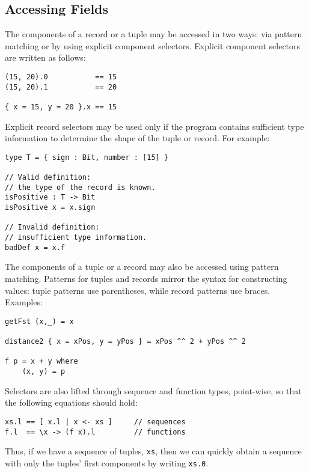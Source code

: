 \hypertarget{accessing-fields}{%
\subsection{Accessing Fields}\label{accessing-fields}}

The components of a record or a tuple may be accessed in two ways: via
pattern matching or by using explicit component selectors. Explicit
component selectors are written as follows:

\begin{verbatim}
(15, 20).0           == 15
(15, 20).1           == 20

{ x = 15, y = 20 }.x == 15
\end{verbatim}

Explicit record selectors may be used only if the program contains
sufficient type information to determine the shape of the tuple or
record. For example:

\begin{verbatim}
type T = { sign : Bit, number : [15] }

// Valid definition:
// the type of the record is known.
isPositive : T -> Bit
isPositive x = x.sign

// Invalid definition:
// insufficient type information.
badDef x = x.f
\end{verbatim}

The components of a tuple or a record may also be accessed using pattern
matching. Patterns for tuples and records mirror the syntax for
constructing values: tuple patterns use parentheses, while record
patterns use braces. Examples:

\begin{verbatim}
getFst (x,_) = x

distance2 { x = xPos, y = yPos } = xPos ^^ 2 + yPos ^^ 2

f p = x + y where
    (x, y) = p
\end{verbatim}

Selectors are also lifted through sequence and function types,
point-wise, so that the following equations should hold:

\begin{verbatim}
xs.l == [ x.l | x <- xs ]     // sequences
f.l  == \x -> (f x).l         // functions
\end{verbatim}

Thus, if we have a sequence of tuples, \texttt{xs}, then we can quickly
obtain a sequence with only the tuples' first components by writing
\texttt{xs.0}.


